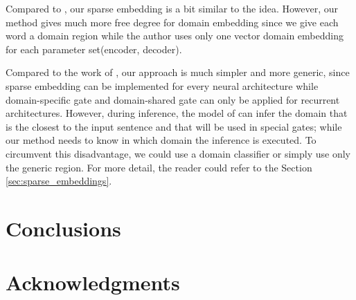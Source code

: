 \documentclass[11pt,a4paper]{article}
\newcommand{\fyTodo}[1]{\Todo[FY:]{\textcolor{orange}{#1}}}
\begin{document}
Compared to \cite{Platanios18contextual}, our sparse embedding is a bit similar to the idea. However, our method gives much more free degree for domain embedding since we give each word a domain region while the author uses only one vector domain embedding for each parameter set(encoder, decoder).

Compared to the work of \cite{Zeng18multidomain}, our approach is much simpler and
more generic, since sparse embedding can be implemented for every neural architecture while domain-specific gate and domain-shared gate can only be applied for recurrent architectures. However, during inference, the model of \cite{Zeng18multidomain} can infer the domain that is the closest to the input sentence and that will be used in special gates; while our method needs to know in which domain the inference is executed. To circumvent this disadvantage, we could use a domain classifier or simply use only the generic region. For more detail, the reader could refer to the Section \ref{sec:sparse_embeddings}.

\section{Conclusions}
\fyTodo{natural continuations: bayesian version ? linear combination of specialized engines ? go beyond words; learn the projection matrix at the word level; other ?}

\section*{Acknowledgments}
\fyTodo{Homegenize refs - urls, addresses, etc}


\end{document}
